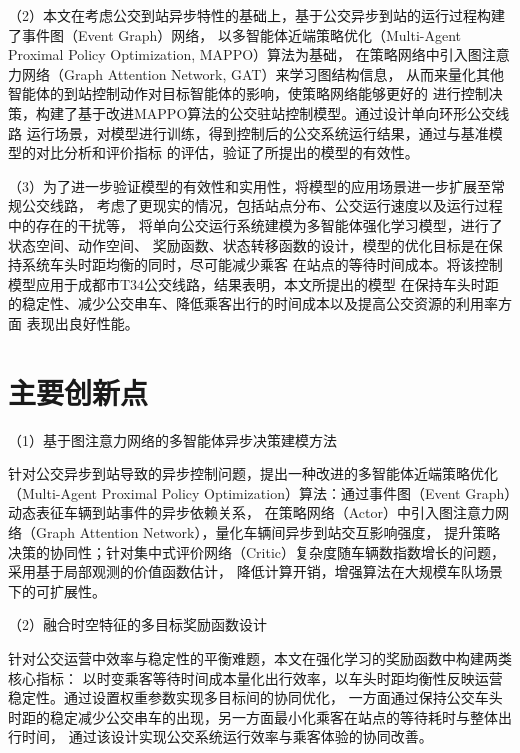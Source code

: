 （2）本文在考虑公交到站异步特性的基础上，基于公交异步到站的运行过程构建了事件图（Event Graph）网络，
以多智能体近端策略优化（Multi-Agent Proximal Policy Optimization, MAPPO）算法为基础，
在策略网络中引入图注意力网络（Graph Attention Network, GAT）来学习图结构信息，
从而来量化其他智能体的到站控制动作对目标智能体的影响，使策略网络能够更好的
进行控制决策，构建了基于改进MAPPO算法的公交驻站控制模型。通过设计单向环形公交线路
运行场景，对模型进行训练，得到控制后的公交系统运行结果，通过与基准模型的对比分析和评价指标
的评估，验证了所提出的模型的有效性。

（3）为了进一步验证模型的有效性和实用性，将模型的应用场景进一步扩展至常规公交线路，
考虑了更现实的情况，包括站点分布、公交运行速度以及运行过程中的存在的干扰等，
将单向公交运行系统建模为多智能体强化学习模型，进行了状态空间、动作空间、
奖励函数、状态转移函数的设计，模型的优化目标是在保持系统车头时距均衡的同时，尽可能减少乘客
在站点的等待时间成本。将该控制模型应用于成都市T34公交线路，结果表明，本文所提出的模型
在保持车头时距的稳定性、减少公交串车、降低乘客出行的时间成本以及提高公交资源的利用率方面
表现出良好性能。

\section{主要创新点}

（1）基于图注意力网络的多智能体异步决策建模方法

针对公交异步到站导致的异步控制问题，提出一种改进的多智能体近端策略优化
（Multi-Agent Proximal Policy Optimization）算法：通过事件图（Event Graph）动态表征车辆到站事件的异步依赖关系，
在策略网络（Actor）中引入图注意力网络（Graph Attention Network），量化车辆间异步到站交互影响强度，
提升策略决策的协同性；针对集中式评价网络（Critic）复杂度随车辆数指数增长的问题，采用基于局部观测的价值函数估计，
降低计算开销，增强算法在大规模车队场景下的可扩展性。

（2）融合时空特征的多目标奖励函数设计

针对公交运营中效率与稳定性的平衡难题，本文在强化学习的奖励函数中构建两类核心指标：
以时变乘客等待时间成本量化出行效率，以车头时距均衡性反映运营稳定性。通过设置权重参数实现多目标间的协同优化，
一方面通过保持公交车头时距的稳定减少公交串车的出现，另一方面最小化乘客在站点的等待耗时与整体出行时间，
通过该设计实现公交系统运行效率与乘客体验的协同改善。



